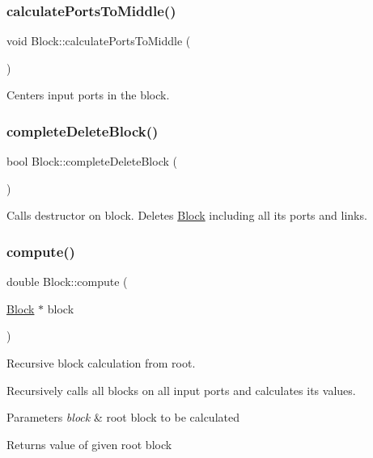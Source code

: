 \subsubsection{\texorpdfstring{calculate\+Ports\+To\+Middle()}{calculatePortsToMiddle()}}
{\footnotesize\ttfamily void Block\+::calculate\+Ports\+To\+Middle (\begin{DoxyParamCaption}{ }\end{DoxyParamCaption})\hspace{0.3cm}{\ttfamily [private]}}

Centers input ports in the block. \mbox{\label{classBlock_a5429186079cf37c2b09fef7d377f8a28}} 
\subsubsection{\texorpdfstring{complete\+Delete\+Block()}{completeDeleteBlock()}}
{\footnotesize\ttfamily bool Block\+::complete\+Delete\+Block (\begin{DoxyParamCaption}{ }\end{DoxyParamCaption})}

Calls destructor on block. Deletes \hyperlink{classBlock}{Block} including all its ports and links. \mbox{\label{classBlock_a801eecced930d343cd4cd5fa14068be1}} 
\subsubsection{\texorpdfstring{compute()}{compute()}}
{\footnotesize\ttfamily double Block\+::compute (\begin{DoxyParamCaption}\item[{\hyperlink{classBlock}{Block} $\ast$}]{block }\end{DoxyParamCaption})\hspace{0.3cm}{\ttfamily [static]}}

Recursive block calculation from root.

Recursively calls all blocks on all input ports and calculates its values. 
\begin{DoxyParams}{Parameters}
{\em block} & root block to be calculated \\
\hline
\end{DoxyParams}
\begin{DoxyReturn}{Returns}
value of given root block 
\end{DoxyReturn}
\mbox{\label{classBlock_a3561d9ce6a8eee10ca8c397e3d25dc5c}} 

